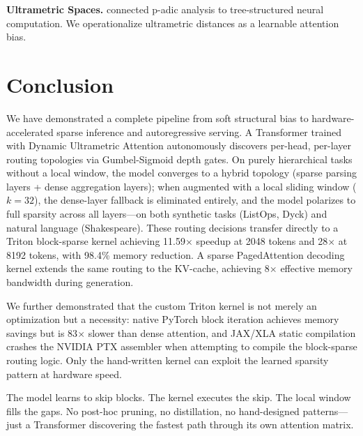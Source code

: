 \documentclass[11pt,a4paper]{article}
\begin{document}
\textbf{Ultrametric Spaces.} \citet{bradley2010mumford} connected p-adic analysis to tree-structured neural computation. We operationalize ultrametric distances as a learnable attention bias.

\section{Conclusion}

We have demonstrated a complete pipeline from soft structural bias to hardware-accelerated sparse inference and autoregressive serving. A Transformer trained with Dynamic Ultrametric Attention autonomously discovers per-head, per-layer routing topologies via Gumbel-Sigmoid depth gates. On purely hierarchical tasks without a local window, the model converges to a hybrid topology (sparse parsing layers + dense aggregation layers); when augmented with a local sliding window ($k=32$), the dense-layer fallback is eliminated entirely, and the model polarizes to full sparsity across all layers---on both synthetic tasks (ListOps, Dyck) and natural language (Shakespeare). These routing decisions transfer directly to a Triton block-sparse kernel achieving 11.59$\times$ speedup at 2048 tokens and 28$\times$ at 8192 tokens, with 98.4\% memory reduction. A sparse PagedAttention decoding kernel extends the same routing to the KV-cache, achieving 8$\times$ effective memory bandwidth during generation.

We further demonstrated that the custom Triton kernel is not merely an optimization but a necessity: native PyTorch block iteration achieves memory savings but is 83$\times$ slower than dense attention, and JAX/XLA static compilation crashes the NVIDIA PTX assembler when attempting to compile the block-sparse routing logic. Only the hand-written kernel can exploit the learned sparsity pattern at hardware speed.

The model learns to skip blocks. The kernel executes the skip. The local window fills the gaps. No post-hoc pruning, no distillation, no hand-designed patterns---just a Transformer discovering the fastest path through its own attention matrix.


\end{document}
